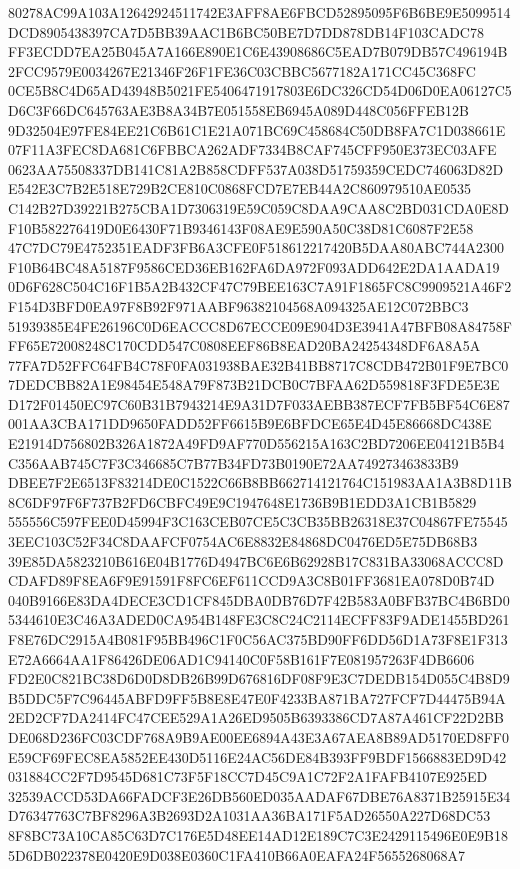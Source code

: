 \documentclass[UTF8,fontset=fandol,zihao=-4,a4paper]{ctexart}
\begin{document}
{{80278AC99A103A12642924511742E3AFF8AE6FBCD52895095F6B6BE9E5099514DCD8905438397CA7D5BB39AAC1B6BC50BE7D7DD878DB14F103CADC78
FF3ECDD7EA25B045A7A166E890E1C6E43908686C5EAD7B079DB57C496194B2FCC9579E0034267E21346F26F1FE36C03CBBC5677182A171CC45C368FC
0CE5B8C4D65AD43948B5021FE5406471917803E6DC326CD54D06D0EA06127C5D6C3F66DC645763AE3B8A34B7E051558EB6945A089D448C056FFEB12B
9D32504E97FE84EE21C6B61C1E21A071BC69C458684C50DB8FA7C1D038661E07F11A3FEC8DA681C6FBBCA262ADF7334B8CAF745CFF950E373EC03AFE
0623AA75508337DB141C81A2B858CDFF537A038D51759359CEDC746063D82DE542E3C7B2E518E729B2CE810C0868FCD7E7EB44A2C860979510AE0535
C142B27D39221B275CBA1D7306319E59C059C8DAA9CAA8C2BD031CDA0E8DF10B582276419D0E6430F71B9346143F08AE9E590A50C38D81C6087F2E58
47C7DC79E4752351EADF3FB6A3CFE0F518612217420B5DAA80ABC744A2300F10B64BC48A5187F9586CED36EB162FA6DA972F093ADD642E2DA1AADA19
0D6F628C504C16F1B5A2B432CF47C79BEE163C7A91F1865FC8C9909521A46F2F154D3BFD0EA97F8B92F971AABF96382104568A094325AE12C072BBC3
51939385E4FE26196C0D6EACCC8D67ECCE09E904D3E3941A47BFB08A84758FFF65E72008248C170CDD547C0808EEF86B8EAD20BA24254348DF6A8A5A
77FA7D52FFC64FB4C78F0FA031938BAE32B41BB8717C8CDB472B01F9E7BC07DEDCBB82A1E98454E548A79F873B21DCB0C7BFAA62D559818F3FDE5E3E
D172F01450EC97C60B31B7943214E9A31D7F033AEBB387ECF7FB5BF54C6E87001AA3CBA171DD9650FADD52FF6615B9E6BFDCE65E4D45E86668DC438E
E21914D756802B326A1872A49FD9AF770D556215A163C2BD7206EE04121B5B4C356AAB745C7F3C346685C7B77B34FD73B0190E72AA749273463833B9
DBEE7F2E6513F83214DE0C1522C66B8BB662714121764C151983AA1A3B8D11B8C6DF97F6F737B2FD6CBFC49E9C1947648E1736B9B1EDD3A1CB1B5829
555556C597FEE0D45994F3C163CEB07CE5C3CB35BB26318E37C04867FE755453EEC103C52F34C8DAAFCF0754AC6E8832E84868DC0476ED5E75DB68B3
39E85DA5823210B616E04B1776D4947BC6E6B62928B17C831BA33068ACCC8DCDAFD89F8EA6F9E91591F8FC6EF611CCD9A3C8B01FF3681EA078D0B74D
040B9166E83DA4DECE3CD1CF845DBA0DB76D7F42B583A0BFB37BC4B6BD05344610E3C46A3ADED0CA954B148FE3C8C24C2114ECFF83F9ADE1455BD261
F8E76DC2915A4B081F95BB496C1F0C56AC375BD90FF6DD56D1A73F8E1F313E72A6664AA1F86426DE06AD1C94140C0F58B161F7E081957263F4DB6606
FD2E0C821BC38D6D0D8DB26B99D676816DF08F9E3C7DEDB154D055C4B8D9B5DDC5F7C96445ABFD9FF5B8E8E47E0F4233BA871BA727FCF7D44475B94A
2ED2CF7DA2414FC47CEE529A1A26ED9505B6393386CD7A87A461CF22D2BBDE068D236FC03CDF768A9B9AE00EE6894A43E3A67AEA8B89AD5170ED8FF0
E59CF69FEC8EA5852EE430D5116E24AC56DE84B393FF9BDF1566883ED9D42031884CC2F7D9545D681C73F5F18CC7D45C9A1C72F2A1FAFB4107E925ED
32539ACCD53DA66FADCF3E26DB560ED035AADAF67DBE76A8371B25915E34D76347763C7BF8296A3B2693D2A1031AA36BA171F5AD26550A227D68DC53
8F8BC73A10CA85C63D7C176E5D48EE14AD12E189C7C3E2429115496E0E9B185D6DB022378E0420E9D038E0360C1FA410B66A0EAFA24F5655268068A7
}}
\end{document}
